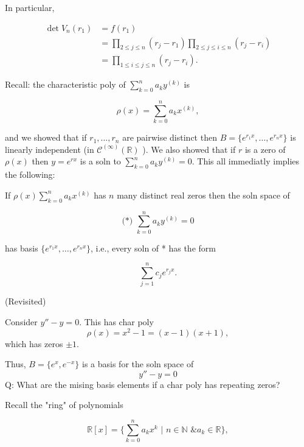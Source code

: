 \begin{example}
  In particular, 

  \begin{align*}
    \det V_n(r_1) &= f(r_1) \\
    &= \prod\limits_{2 \leq j \leq n}(r_j - r_1)  \prod\limits_{2 \leq j
    \leq i \leq n}(r_j-r_i) \\
    &= \prod\limits_{1 \leq i \leq j \leq n}(r_j - r_i).
  \end{align*}

\end{example}

\hrulefill

Recall: the characteristic poly of \( \sum_{k=0}^n a_ky^{(k)} \) is 

\[ \rho (x) =  \sum_{k=0}^n a_kx^{(k)}  , \]

and we showed that if \( r_1, \dots , r_n \) are pairwise distinct then
\( B = \{ e^{r_1x}, \dots , e^{r_nx}\} \) is linearly independent (in \(
\mathscr{C}^{( \infty )} (\mathbb{R})\) ). We also showed that if \( r \) is a
zero of \( \rho (x) \) then \( y = e^{rx} \) is a soln to \(
\sum_{k=0}^n a_ky^{(k)} = 0  \). This all immediatly implies the
following: 

\begin{theorem}
  If \(\rho (x)  \sum_{k=0}^n a_kx^{(k)} \) has \( n \) many distinct
  real zeros then  the soln space of 

  \[\text{(*) } \sum_{k=0}^n a_ky^{(k)}  = 0 \]

  has basis \( \{ e^{r_1x} , \dots , e^{r_nx}\} \), i.e., every soln of *
  has the form 

  \[ \sum_{j=1}^n c_je^{r_jx} . \]
\end{theorem}

\begin{example}
  (Revisited)

  Consider \( y'' - y = 0 \). This has char poly 
  \[ \rho (x) = x^2 -1 = (x-1)(x+1)  ,\]
  which has zeros \( \pm 1 \). 

  Thus, \( B = \{ e^x , e^{-x} \} \) is a basis for the soln space of 
  \[ y'' - y = 0  \]
  Q: What are the mising basis elements if a char poly has repeating
  zeros?

\end{example}

Recall the "ring" of polynomials 

\[ \mathbb{R}[x] = \{ \sum_{k=0}^n a_kx^k \text{ | } n \in \mathbb{N}
\text{ \& } a_k \in \mathbb{R} \} ,\]

